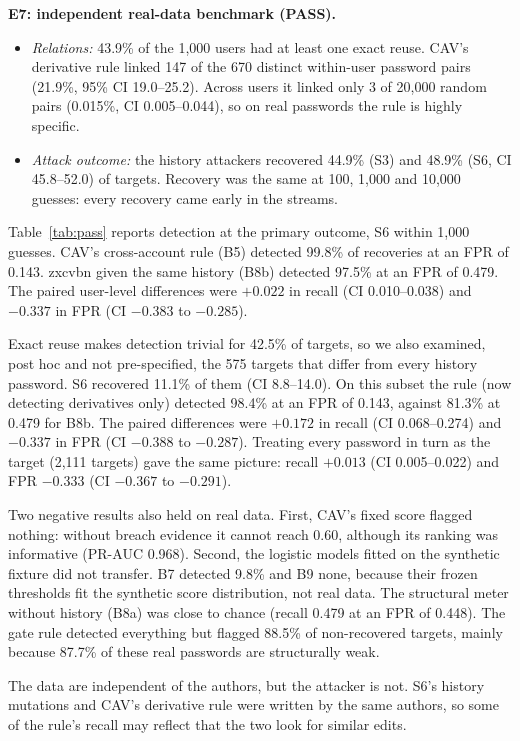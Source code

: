 \documentclass[conference]{IEEEtran}
\begin{document}
\textbf{E7: independent real-data benchmark (PASS).} 
\begin{itemize}
\item \emph{Relations:} 43.9\% of the 1,000 users had at least one exact reuse. CAV's derivative rule linked 147 of the 670 distinct within-user password pairs (21.9\%, 95\% CI 19.0--25.2). Across users it linked only 3 of 20,000 random pairs (0.015\%, CI 0.005--0.044), so on real passwords the rule is highly specific.
\item \emph{Attack outcome:} the history attackers recovered 44.9\% (S3) and 48.9\% (S6, CI 45.8--52.0) of targets. Recovery was the same at 100, 1,000 and 10,000 guesses: every recovery came early in the streams.
\end{itemize}
Table~\ref{tab:pass} reports detection at the primary outcome, S6 within 1,000 guesses. CAV's cross-account rule (B5) detected 99.8\% of recoveries at an FPR of 0.143. zxcvbn given the same history (B8b) detected 97.5\% at an FPR of 0.479. The paired user-level differences were $+0.022$ in recall (CI 0.010--0.038) and $-0.337$ in FPR (CI $-0.383$ to $-0.285$).

Exact reuse makes detection trivial for 42.5\% of targets, so we also examined, post hoc and not pre-specified, the 575 targets that differ from every history password. S6 recovered 11.1\% of them (CI 8.8--14.0). On this subset the rule (now detecting derivatives only) detected 98.4\% at an FPR of 0.143, against 81.3\% at 0.479 for B8b. The paired differences were $+0.172$ in recall (CI 0.068--0.274) and $-0.337$ in FPR (CI $-0.388$ to $-0.287$). Treating every password in turn as the target (2,111 targets) gave the same picture: recall $+0.013$ (CI 0.005--0.022) and FPR $-0.333$ (CI $-0.367$ to $-0.291$).

Two negative results also held on real data. First, CAV's fixed score flagged nothing: without breach evidence it cannot reach 0.60, although its ranking was informative (PR-AUC 0.968). Second, the logistic models fitted on the synthetic fixture did not transfer. B7 detected 9.8\% and B9 none, because their frozen thresholds fit the synthetic score distribution, not real data. The structural meter without history (B8a) was close to chance (recall 0.479 at an FPR of 0.448). The gate rule detected everything but flagged 88.5\% of non-recovered targets, mainly because 87.7\% of these real passwords are structurally weak.

The data are independent of the authors, but the attacker is not. S6's history mutations and CAV's derivative rule were written by the same authors, so some of the rule's recall may reflect that the two look for similar edits.
\end{document}
